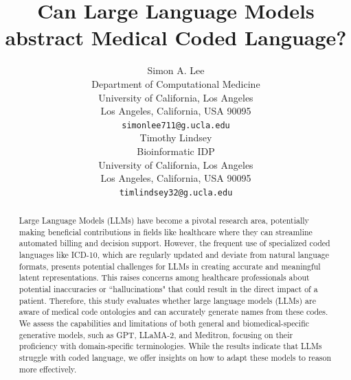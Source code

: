 \documentclass[11pt]{article}
\title{Can Large Language Models abstract Medical Coded Language?}
\author{Simon A. Lee \\
Department of Computational Medicine\\
University of California, Los Angeles\\
Los Angeles, California, USA 90095\\
  \texttt{simonlee711@g.ucla.edu} \\\And
  Timothy Lindsey \\
  Bioinformatic IDP\\
University of California, Los Angeles \\
Los Angeles, California, USA 90095\\
  \texttt{timlindsey32@g.ucla.edu} \\}
\theoremstyle{plain}
\theoremstyle{definition}
\theoremstyle{remark}
\begin{document}
\maketitle
\begin{abstract}
Large Language Models (LLMs) have become a pivotal research area, potentially making beneficial contributions in fields like healthcare where they can streamline automated billing and decision support. However, the frequent use of specialized coded languages like ICD-10, which are regularly updated and deviate from natural language formats, presents potential challenges for LLMs in creating accurate and meaningful latent representations. This raises concerns among healthcare professionals about potential inaccuracies or ``hallucinations" that could result in the direct impact of a patient. Therefore, this study evaluates whether large language models (LLMs) are aware of medical code ontologies and can accurately generate names from these codes. We assess the capabilities and limitations of both general and biomedical-specific generative models, such as GPT, LLaMA-2, and Meditron, focusing on their proficiency with domain-specific terminologies. While the results indicate that LLMs struggle with coded language, we offer insights on how to adapt these models to reason more effectively.

\end{abstract}
\end{document}
